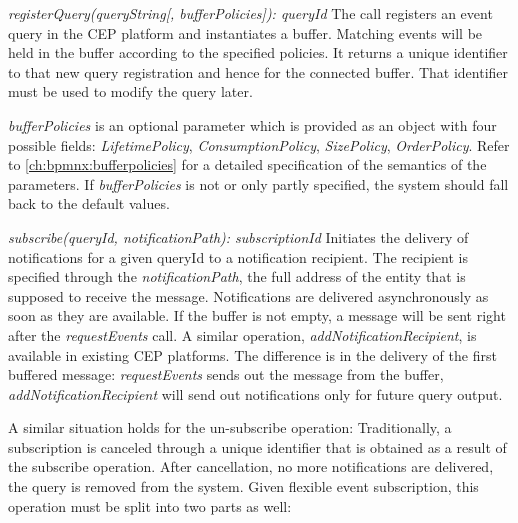 \begin{aenumerate}
	\item \textit{registerQuery(queryString[, bufferPolicies]): queryId}\newline
	The call registers an event query in the CEP platform and instantiates a buffer. Matching events will be held in the buffer according to the specified  policies. It returns a unique identifier to that new query registration and hence for the connected buffer. That identifier must be used to modify the query later.
	
	\textit{bufferPolicies} is an optional parameter which is provided as an object with four possible fields: \textit{LifetimePolicy}, \textit{ConsumptionPolicy}, \textit{SizePolicy}, \textit{OrderPolicy}. Refer to \autoref{ch:bpmnx:bufferpolicies} for a detailed specification of the semantics of the parameters. If \textit{bufferPolicies} is not or only partly specified, the system should fall back to the default values.
	
	\item \textit{subscribe(queryId, notificationPath): subscriptionId}\newline
	Initiates the delivery of notifications for a given queryId to a notification recipient.
	The recipient is specified through the \textit{notificationPath}, the full address of the entity that is supposed to receive the message.
	Notifications are delivered asynchronously as soon as they are available. If the buffer is not empty, a message will be sent right after the \textit{requestEvents} call.
	A similar operation, \textit{addNotificationRecipient}, is available in existing CEP platforms. The difference is in the delivery of the first buffered message: \textit{requestEvents} sends out the message from the buffer, \textit{addNotificationRecipient} will send out notifications only for future query output.
\end{aenumerate}\label{def:apiextension-subscribe}


A similar situation holds for the un-subscribe operation: Traditionally, a subscription is canceled through a unique identifier that is obtained as a result of the subscribe operation. After cancellation, no more notifications are delivered, the query is removed from the system.
Given flexible event subscription, this operation must be split into two parts as well:

